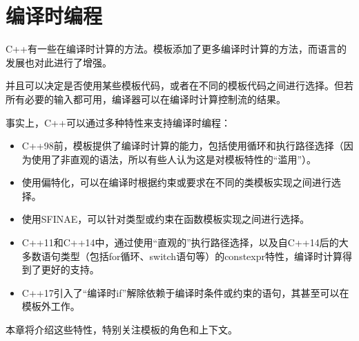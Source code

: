 \chapter{编译时编程}
C++有一些在编译时计算的方法。模板添加了更多编译时计算的方法，而语言的发展也对此进行了增强。

并且可以决定是否使用某些模板代码，或者在不同的模板代码之间进行选择。但若所有必要的输入都可用，编译器可以在编译时计算控制流的结果。

事实上，C++可以通过多种特性来支持编译时编程：

\begin{itemize}
\item 
C++98前，模板提供了编译时计算的能力，包括使用循环和执行路径选择（因为使用了非直观的语法，所以有些人认为这是对模板特性的“滥用”）。

\item 
使用偏特化，可以在编译时根据约束或要求在不同的类模板实现之间进行选择。

\item 
使用SFINAE，可以针对类型或约束在函数模板实现之间进行选择。

\item 
C++11和C++14中，通过使用“直观的”执行路径选择，以及自C++14后的大多数语句类型（包括for循环、switch语句等）的constexpr特性，编译时计算得到了更好的支持。

\item 
C++17引入了“编译时if”解除依赖于编译时条件或约束的语句，其甚至可以在模板外工作。
\end{itemize}

本章将介绍这些特性，特别关注模板的角色和上下文。








